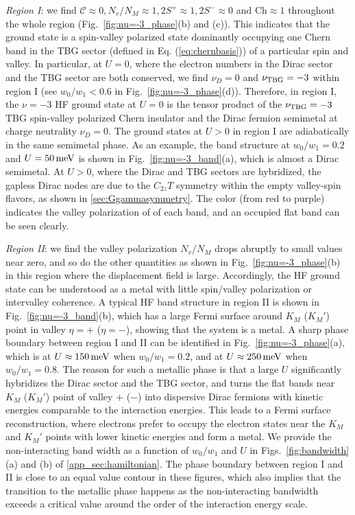 \documentclass[prb,aps,nofootinbib,amssymb,twocolumn,superscriptaddress,10pt]{revtex4-2}
\begin{document}
{\it Region I}: we find $\mathcal{C}\approx 0, N_v/N_M\approx 1, 2S^+\approx 1, 2S^- \approx 0$ and $\mathrm{Ch}\approx 1$ throughout the whole region (Fig.~\ref{fig:nu=-3_phase}(b) and (c)). This indicates that the ground state is a spin-valley polarized state dominantly occupying one Chern band in the TBG sector (defined in Eq. (\ref{eq:chernbasis})) of a particular spin and valley. In particular, at $U=0$, where the electron numbers in the Dirac sector and the TBG sector are both conserved, we find $\nu_D=0$ and $\nu_{\rm TBG}=-3$ within region I (see $w_0/w_1<0.6$ in Fig.~\ref{fig:nu=-3_phase}(d)). Therefore, in region I, the $\nu=-3$ HF ground state at $U=0$ is the tensor product of the $\nu_{\rm TBG}=-3$ TBG spin-valley polarized Chern insulator and the Dirac fermion semimetal at charge neutrality $\nu_D=0$. The ground states at $U>0$ in region I are adiabatically in the same semimetal phase.
As an example, the band structure at $w_0/w_1 = 0.2$ and $U=50\,\rm meV$ is shown in Fig.~\ref{fig:nu=-3_band}(a), which is almost a Dirac semimetal. At $U>0$, where the Dirac and TBG sectors are hybridized, the gapless Dirac nodes are due to the $C_{2z}T$ symmetry within the empty valley-spin flavors, as shown in \ref{sec:Ggammasymmetry}. The color (from red to purple) indicates the valley polarization of of each band, and an occupied flat band can be seen clearly.

{\it Region II}: we find the valley polarization $N_v/N_M$ drops abruptly to small values near zero, and so do the other quantities as shown in Fig.~\ref{fig:nu=-3_phase}(b) in this region where the displacement field is large. Accordingly, the HF ground state can be understood as a metal with little spin/valley polarization or intervalley coherence.
A typical HF band structure in region II is shown in Fig.~\ref{fig:nu=-3_band}(b), which has a large Fermi surface around $K_M$ ($K_M'$) point in valley $\eta=+$ ($\eta=-$), showing that the system is a metal. A sharp phase boundary between region I and II can be identified in Fig.~\ref{fig:nu=-3_phase}(a), which is at $U\approx 150\rm\,meV$ when $w_0/w_1=0.2$, and at $U \approx 250\rm\,meV$ when $w_0/w_1=0.8$. The reason for such a metallic phase is that a large $U$ significantly hybridizes the Dirac sector and the TBG sector, and turns the flat bands near $K_M$ ($K_M'$) point of valley $+$ ($-$) into dispersive Dirac fermions with kinetic energies comparable to the interaction energies. This leads to a Fermi surface reconstruction, where electrons prefer to occupy the electron states near the $K_M$ and $K_M'$ points with lower kinetic energies and form a metal. We provide the non-interacting band width as a function of $w_0/w_1$ and $U$ in Figs.~\ref{fig:bandwidth}(a) and (b) of \ref{app_sec:hamiltonian}. The phase boundary between region I and II is close to an equal value contour in these figures, which also implies that the transition to the metallic phase happens as the non-interacting bandwidth exceeds a critical value around the order of the interaction energy scale.
\end{document}
